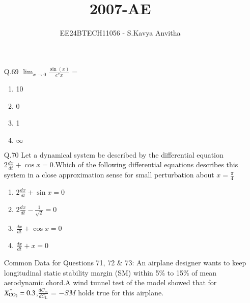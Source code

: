 \documentclass[journal]{IEEEtran}
\begin{document}

\vspace{3cm}

\title{2007-AE}
\author{EE24BTECH11056 - S.Kavya Anvitha}
\maketitle
\bigskip

\renewcommand{\thefigure}{\theenumi}
\renewcommand{\thetable}{\theenumi}
\begin{enumerate}
\item[Q.69] $\lim_{x \to 0} \frac{\sin(x)}{e^xx} = $
\begin{enumerate}
    \item 10
    \item 0
    \item 1
    \item $\infty$\\
\end{enumerate}
\item[Q.70]Let a dynamical system be described by the differential equation $2\frac{dx}{dt} + \cos{x} = 0$.Which of the following differential equations describes this system in a close approximation sense for small perturbation about $x = \frac{\pi}{4}$
\begin{enumerate}
    \item $2\frac{dx}{dt} + \sin{x} = 0$
    \item $2\frac{dx}{dt} - \frac{1}{\sqrt{2}} = 0$
    \item $\frac{dx}{dt} + \cos{x} = 0$
    \item $\frac{dx}{dt} + x = 0$\\
\end{enumerate}

Common Data for Questions 71, 72 \& 73: An airplane designer wants to keep longitudinal static stability margin (SM) within 5\% to 15\% of mean  aerodynamic chord.A wind tunnel test of the model showed that for $\Bar{X_{\text{CO}_2}} = 0.3$,$\frac{dC_{\text{m}}}{dC_{\text{L}}}$ = $-SM$ holds true for this airplane.\\


\end{enumerate}
\end{document}
